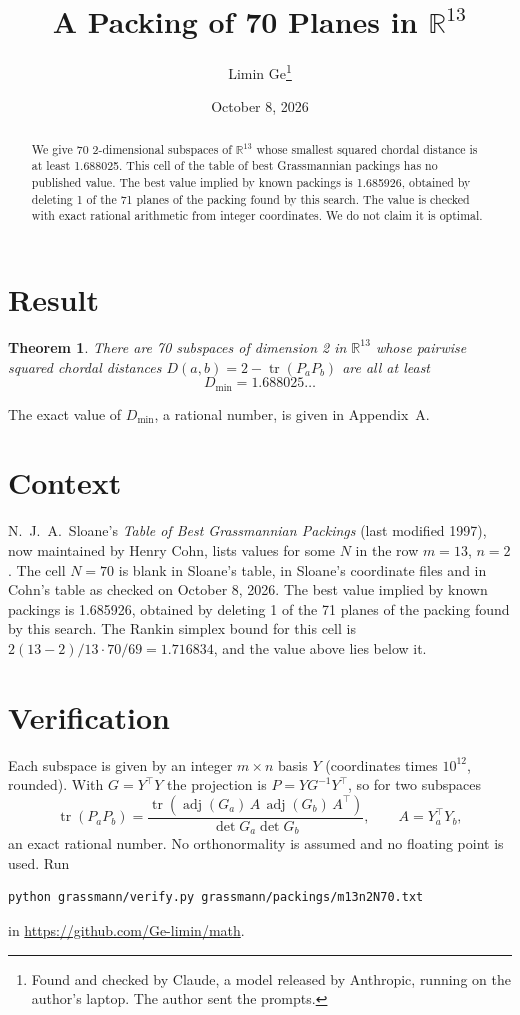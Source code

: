 \documentclass[11pt,a4paper]{article}
\title{A Packing of 70 Planes in $\mathbb{R}^{13}$}
\author{Limin Ge\thanks{Found and checked by Claude, a model released by Anthropic, running on the author's laptop. The author sent the prompts.}}
\date{October 8, 2026}
\newtheorem*{theorem}{Theorem}
\begin{document}
\maketitle
\begin{abstract}
We give 70 2-dimensional subspaces of $\mathbb{R}^{13}$ whose smallest squared chordal distance is at least 1.688025. This cell of the table of best Grassmannian packings has no published value. The best value implied by known packings is 1.685926, obtained by deleting 1 of the 71 planes of the packing found by this search. The value is checked with exact rational arithmetic from integer coordinates. We do not claim it is optimal.
\end{abstract}

\section{Result}
\begin{theorem}
There are 70 subspaces of dimension 2 in $\mathbb{R}^{13}$ whose pairwise squared chordal distances $D(a,b) = 2 - \operatorname{tr}(P_aP_b)$ are all at least
\[ D_{\min} = 1.688025\ldots \]
\end{theorem}
The exact value of $D_{\min}$, a rational number, is given in Appendix~A.


\section{Context}
N.~J.~A.~Sloane's \emph{Table of Best Grassmannian Packings} (last modified 1997), now maintained by Henry Cohn, lists values for some $N$ in the row $m=13$, $n=2$. The cell $N=70$ is blank in Sloane's table, in Sloane's coordinate files and in Cohn's table as checked on October 8, 2026. The best value implied by known packings is 1.685926, obtained by deleting 1 of the 71 planes of the packing found by this search. The Rankin simplex bound for this cell is $2(13-2)/13\cdot 70/69 = 1.716834$, and the value above lies below it.


\section{Verification}
Each subspace is given by an integer $m\times n$ basis $Y$ (coordinates times $10^{12}$, rounded). With $G=Y^\top Y$ the projection is $P=YG^{-1}Y^\top$, so for two subspaces
\[ \operatorname{tr}(P_aP_b)=\frac{\operatorname{tr}(\operatorname{adj}(G_a)\,A\,\operatorname{adj}(G_b)\,A^\top)}{\det G_a\det G_b},\qquad A=Y_a^\top Y_b, \]
an exact rational number. No orthonormality is assumed and no floating point is used. Run
\begin{verbatim}
python grassmann/verify.py grassmann/packings/m13n2N70.txt
\end{verbatim}
in \url{https://github.com/Ge-limin/math}.
\end{document}

